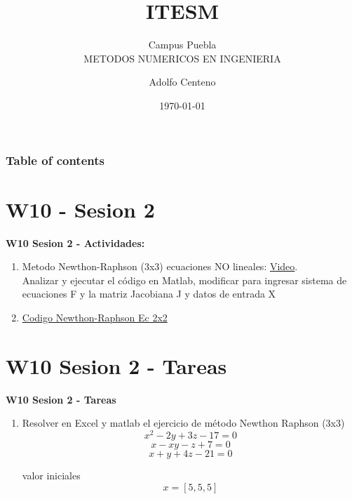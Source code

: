 \documentclass{beamer}
\begin{document}
\title{ITESM}  
\subtitle{Campus Puebla\\METODOS NUMERICOS EN INGENIERIA
}
\author{Adolfo Centeno}
\date{\today} 


\begin{frame}
\titlepage
\end{frame}

\begin{frame}\frametitle{Table of contents}
\tableofcontents
\end{frame} 


\section{W10 - Sesion 2 }

\begin{frame}

\textbf{W10 Sesion 2 - Actividades:}

\begin{enumerate}
\item
	Metodo Newthon-Raphson (3x3) ecuaciones NO lineales: \href{https://www.youtube.com/watch?v=QS3wqOQabVY}{Video}.\\Analizar y ejecutar el código en Matlab, modificar para ingresar sistema de ecuaciones F y la matriz Jacobiana J y datos de entrada X	

\item
	\href{https://github.com/adsoftsito/metodos-numericos/blob/master/w10/newthon-raphson/newton_raphson_2.pdf}{Codigo Newthon-Raphson Ec 2x2} 
	

\end{enumerate} 

\end{frame}


\section{W10 Sesion 2 - Tareas }

\begin{frame}


\textbf{W10 Sesion 2 - Tareas}


\begin{enumerate}
\item

Resolver en Excel y matlab el ejercicio de método Newthon Raphson (3x3) \\

\[ x^2 -  2y + 3z - 17 = 0 \]  
\[ x -  xy - z + 7  = 0 \] 
\[ x +  y + 4z -21   = 0 \] 

valor iniciales \[ x = [5, 5, 5] \]

\end{enumerate} 


\end{frame}
\end{document}
